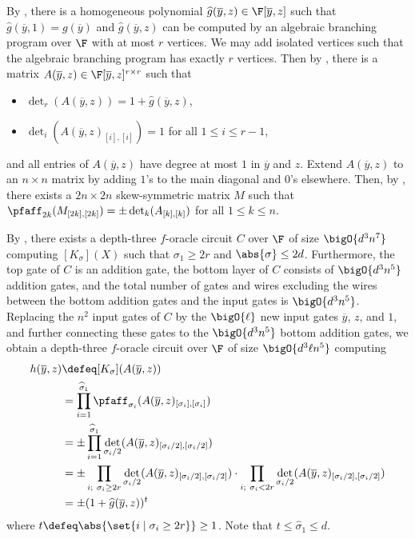 \documentclass[letterpaper, 11pt]{amsart}
\begin{document}
\begin{pf}
    By , there is a homogeneous polynomial $\widehat{g}(\overline{y}, z) \in \F[\overline{y}, z]$ such that $\widehat{g}(\overline{y}, 1) = g(\overline{y})$ and $\widehat{g}(\overline{y}, z)$ can be computed by an algebraic branching program over $\F$ with at most $r$ vertices.
    We may add isolated vertices such that the algebraic branching program has exactly $r$ vertices.
    Then by , there is a matrix $A(\overline{y}, z) \in \F[\overline{y}, z]^{r \times r}$ such that
    \begin{itemize}
        \item $\det_r(A(\overline{y}, z)) = 1 + \widehat{g}(\overline{y}, z)$,
        \item $\det_i(A(\overline{y}, z)_{[i], [i]}) = 1$ for all $1 \leq i \leq r - 1$,
    \end{itemize}
    and all entries of $A(\overline{y}, z)$ have degree at most $1$ in $\overline{y}$ and $z$.  
    Extend $A(\overline{y}, z)$ to an $n\times n$ matrix by adding $1$'s to the main diagonal and $0$'s elsewhere.
     Then, by , there exists a $2n \times 2n$ skew-symmetric matrix $M$ such that $\pfaff_{2k}(M_{[2k], [2k]}) = \pm \det_k(A_{[k], [k]})$ for all $1 \leq k \leq n$.
    
    By , there exists a depth-three $f$-oracle circuit $C$ over $\F$ of size $\bigO{d^3 n^7}$ computing $[K_\sigma](X)$ such that $\sigma_1 \geq 2r$ and $\abs{\sigma} \leq 2d$.
    Furthermore, the top gate of $C$ is an addition gate, the bottom layer of $C$ consists of $\bigO{d^3 n^5}$ addition gates, and the total number of gates and wires excluding the wires between the bottom addition gates and the input gates is $\bigO{d^3 n^5}$.
    Replacing the $n^2$ input gates of $C$ by the $\bigO{\ell}$ new input gates $\overline{y}$, $z$, and $1$, and further connecting these gates to the $\bigO{d^3 n^5}$ bottom addition gates, we obtain a depth-three $f$-oracle circuit over $\F$ of size $\bigO{d^3 \ell n^5}$ computing 
    \begin{align*}
        h(\overline{y}, z) &\defeq [K_\sigma](A(\overline{y}, z)) \\
                           &= \prod_{i = 1}^{\widehat{\sigma}_1} \pfaff_{\sigma_i}(A(\overline{y}, z)_{[\sigma_i], [\sigma_i]}) \\
                           &= \pm \prod_{i = 1}^{\widehat{\sigma}_1} \det_{\sigma_i / 2}(A(\overline{y}, z)_{[\sigma_i / 2], [\sigma_i / 2]}) \\
                           &= \pm \prod_{i;\ \sigma_i \geq 2r} \det_{\sigma_i / 2} (A(\overline{y}, z)_{[\sigma_i / 2], [\sigma_i / 2]}) \cdot \prod_{i;\ \sigma_i < 2r} \det_{\sigma_i / 2}(A(\overline{y}, z)_{[\sigma_i / 2], [\sigma_i / 2]}) \\
                           &= \pm (1 + \widehat{g}(\overline{y}, z))^t
    \end{align*}
    where $t \defeq \abs{\set{i \mid \sigma_i \geq 2r}} \geq 1$.
    Note that $t \leq \widehat{\sigma}_1 \leq d$.
    

\end{pf}
\end{document}
